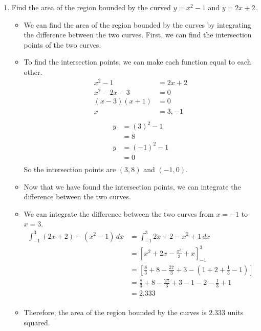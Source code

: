 \documentclass[12pt]{article}
\begin{document}
\begin{enumerate}[leftmargin=\labelsep]
    \item Find the area of the region bounded by the curved $y=x^2-1$ and $y=2x+2$.
    \begin{itemize}[label={}]
        \item We can find the area of the region bounded by the curves by integrating the difference between the two curves. First, we can find the intersection points of the two curves.
        \item To find the intersection points, we can make each function equal to each other.
        \begin{equation*}
            \begin{split}
                x^2-1 &= 2x+2 \\
                x^2-2x-3 &= 0 \\
                (x-3)(x+1) &= 0 \\
                x &= 3, -1 \\
            \end{split}
        \end{equation*}
        \begin{equation*}
            \begin{split}
                y &= (3)^2-1 \\
                &= 8 \\
                y &= (-1)^2-1 \\
                &= 0 \\
            \end{split}
        \end{equation*}
        So the intersection points are $(3,8)$ and $(-1,0)$.
        \item Now that we have found the intersection points, we can integrate the difference between the two curves.
        \item We can integrate the difference between the two curves from $x=-1$ to $x=3$.
        \begin{equation*}
            \begin{split}
                \int_{-1}^{3} (2x+2)-(x^2-1) \, dx &= \int_{-1}^{3} 2x+2-x^2+1 \, dx \\
                &= \left[ x^2 + 2x - \frac{x^3}{3} + x \right]_{-1}^{3} \\
                &= \left[ \frac{8}{3} + 8 - \frac{27}{3} + 3 - \left( 1 + 2 + \frac{1}{3} - 1 \right) \right] \\
                &= \frac{8}{3} + 8 - \frac{27}{3} + 3 - 1 - 2 - \frac{1}{3} + 1 \\
                &= 2.333 \\
            \end{split}
        \end{equation*}
        \item Therefore, the area of the region bounded by the curves is $2.333$ units squared.
    \end{itemize}


\end{enumerate}
\end{document}
